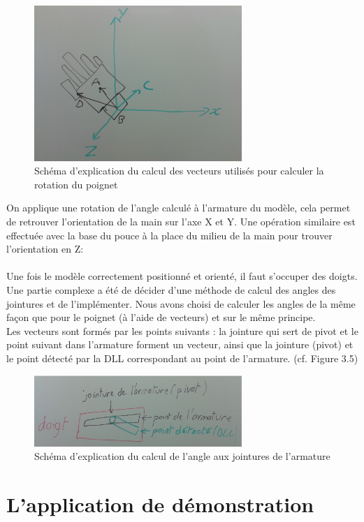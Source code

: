 \begin{figure}[H]
\centering
\includegraphics[width=0.7\textwidth]{images/SchemaRotationMain.jpg}
\caption{Schéma d'explication du calcul des vecteurs utilisés pour calculer la rotation du poignet}
\end{figure}

On applique une rotation de l'angle calculé à l'armature du modèle, cela permet de retrouver l'orientation de la main sur l'axe X et Y.
Une opération similaire est effectuée avec la base du pouce à la place du milieu de la main pour trouver l'orientation en Z: 

\paragraph{}
Une fois le modèle correctement positionné et orienté, il faut s'occuper des doigts. Une partie complexe a été de décider d'une méthode de calcul des angles des jointures et de l'implémenter.
Nous avons choisi de calculer les angles de la même façon que pour le poignet (à l'aide de vecteurs) et sur le même principe.\\
Les vecteurs sont formés par les points suivants : la jointure qui sert de pivot et le point suivant dans l'armature forment un vecteur, ainsi que la jointure (pivot) et le point détecté par la DLL correspondant au point de l'armature. (cf. Figure 3.5)

\newpage

\begin{figure}[H]
 \centering
 \includegraphics[width=0.7\textwidth]{images/SchemaRotationDoigt.png}
 \caption{Schéma d'explication du calcul de l'angle aux jointures de l'armature}
\end{figure}

\section{L'application de démonstration}
